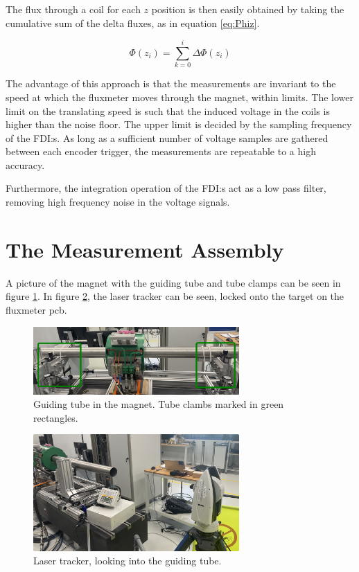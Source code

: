 The flux through a coil for each $z$ position is then easily obtained
by taking the cumulative sum of the delta fluxes, as in equation
\ref{eq:Phiz}.

\begin{equation}
    \Phi(z_i) = \sum \limits_{k=0}^i \Delta \Phi(z_i)
    \label{eq:Phiz}
\end{equation}

The advantage of this approach is that the measurements are invariant
to the speed at which the fluxmeter moves through the magnet, within limits.
The lower limit on the translating speed is such that the induced
voltage in the coils is higher than the noise floor.
The upper limit is decided by the sampling frequency of the FDI:s.
As long as a sufficient number of voltage samples are gathered between
each encoder trigger, the measurements are repeatable to a high accuracy.

Furthermore, the integration operation of the FDI:s act as a
low pass filter, removing high frequency noise in the voltage
signals.

\section{The Measurement Assembly}
A picture of the magnet with the guiding tube and tube clamps can be seen in
figure \ref{fig:magnetassembly}. In figure \ref{fig:leica}, the laser tracker
can be seen, locked onto the target on the fluxmeter pcb.

\begin{figure}[h]
    \centering
    \includegraphics[width=0.7\textwidth]{figs/magnet-assembly}
    \caption{Guiding tube in the magnet. Tube clambs marked in green rectangles.}
    \label{fig:magnetassembly}
\end{figure}

\begin{figure}[h]
    \centering
    \includegraphics[width=0.7\textwidth]{figs/leica}
    \caption{Laser tracker, looking into the guiding tube.}
    \label{fig:leica}
\end{figure}

